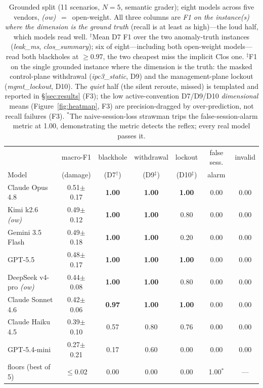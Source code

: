 \documentclass[11pt]{article}
\begin{document}
\begin{table}[t]
\centering\small
\begin{tabular}{@{}lcccccc@{}}
\toprule
 & macro-F1 & blackhole & withdrawal & lockout & false sess. & invalid \\
Model & (damage) & (D7$^{\dagger}$) & (D9$^{\ddagger}$) & (D10$^{\ddagger}$) & alarm & \\
\midrule
Claude Opus 4.8       & 0.51$\pm$0.17 & \textbf{1.00} & \textbf{1.00} & \textbf{1.00} & 0.00 & 0.00 \\
Kimi k2.6 \emph{(ow)} & 0.49$\pm$0.12 & \textbf{1.00} & \textbf{1.00} & 0.80          & 0.00 & 0.00 \\
Gemini 3.5 Flash      & 0.49$\pm$0.18 & \textbf{1.00} & \textbf{1.00} & 0.20          & 0.00 & 0.00 \\
GPT-5.5               & 0.48$\pm$0.17 & \textbf{1.00} & \textbf{1.00} & \textbf{1.00} & 0.00 & 0.00 \\
DeepSeek v4-pro \emph{(ow)} & 0.44$\pm$0.08 & \textbf{1.00} & \textbf{1.00} & 0.80    & 0.00 & 0.00 \\
Claude Sonnet 4.6     & 0.42$\pm$0.06 & \textbf{0.97} & \textbf{1.00} & \textbf{1.00} & 0.00 & 0.00 \\
Claude Haiku 4.5      & 0.39$\pm$0.10 & 0.57          & 0.80          & 0.76          & 0.00 & 0.00 \\
GPT-5.4-mini          & 0.27$\pm$0.21 & 0.17          & 0.60          & 0.00          & 0.00 & 0.00 \\
\midrule
floors (best of 5)    & $\leq$0.02    & 0.00          & 0.00          & 0.00 & 1.00$^{*}$ & --- \\
\bottomrule
\end{tabular}
\caption{Grounded split (11 scenarios, $N{=}5$, semantic grader); eight models
across five vendors, \emph{(ow)}~$=$~open-weight. All three
columns are \emph{F1 on the instance(s) where the dimension is the ground
truth} (recall is at least as high)---the loud half, which models read well.
$^{\dagger}$Mean D7 F1 over the two anomaly-truth instances (\emph{leak\_ms},
\emph{clos\_summary}); six of eight---including both open-weight
models---read both blackholes at $\geq$0.97, the two cheapest miss the
implicit Clos one.
$^{\ddagger}$F1 on the single grounded instance where the dimension is the
truth: the masked control-plane withdrawal (\emph{ipc3\_static}, D9) and the
management-plane lockout (\emph{mgmt\_lockout}, D10). The \emph{quiet} half
(the silent reroute, missed) is templated and reported in \S\ref{sec:results}
(F3); the low active-convention D7/D9/D10 \emph{dimensional} means
(Figure~\ref{fig:heatmap}, F3) are precision-dragged by over-prediction, not
recall failures (F3).
$^{*}$The naive-session-loss strawman trips the false-session-alarm metric
at 1.00, demonstrating the metric detects the reflex; every real model
passes it.
}
\label{tab:grounded}
\end{table}
\end{document}
